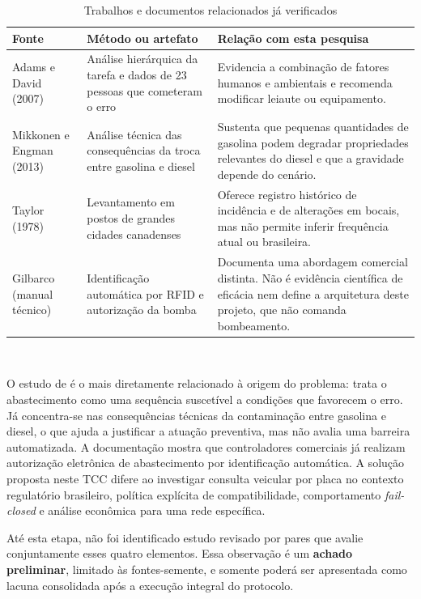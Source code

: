 \begin{table}[H]
  \centering
  \caption{Trabalhos e documentos relacionados já verificados}
  \label{tab:trabalhos-relacionados}
  \small
  \begin{tabularx}{\textwidth}{@{}L{3.2cm}L{3.3cm}Y@{}}
    \toprule
    \textbf{Fonte} & \textbf{Método ou artefato} & \textbf{Relação com esta pesquisa} \\
    \midrule
    Adams e David (2007) & Análise hierárquica da tarefa e dados de 23 pessoas que cometeram o erro & Evidencia a combinação de fatores humanos e ambientais e recomenda modificar leiaute ou equipamento. \\
    Mikkonen e Engman (2013) & Análise técnica das consequências da troca entre gasolina e diesel & Sustenta que pequenas quantidades de gasolina podem degradar propriedades relevantes do diesel e que a gravidade depende do cenário. \\
    Taylor (1978) & Levantamento em postos de grandes cidades canadenses & Oferece registro histórico de incidência e de alterações em bocais, mas não permite inferir frequência atual ou brasileira. \\
    Gilbarco (manual técnico) & Identificação automática por RFID e autorização da bomba & Documenta uma abordagem comercial distinta. Não é evidência científica de eficácia nem define a arquitetura deste projeto, que não comanda bombeamento. \\
    \bottomrule
  \end{tabularx}
  \\[2pt]\fontepropria
\end{table}

O estudo de \cite{adamsDavid2007} é o mais diretamente relacionado à origem do
problema: trata o abastecimento como uma sequência suscetível a condições que
favorecem o erro. Já \cite{mikkonenEngman2013} concentra-se nas consequências
técnicas da contaminação entre gasolina e diesel, o que ajuda a justificar a
atuação preventiva, mas não avalia uma barreira automatizada. A documentação
\cite{gilbarcoFuelPoint2018} mostra que controladores comerciais já realizam
autorização eletrônica de abastecimento por identificação automática. A solução
proposta neste TCC difere ao investigar consulta veicular por placa no contexto
regulatório brasileiro, política explícita de compatibilidade, comportamento
\textit{fail-closed} e análise econômica para uma rede específica.

Até esta etapa, não foi identificado estudo revisado por pares que avalie
conjuntamente esses quatro elementos. Essa observação é um \textbf{achado
preliminar}, limitado às fontes-semente, e somente poderá ser apresentada como
lacuna consolidada após a execução integral do protocolo.

